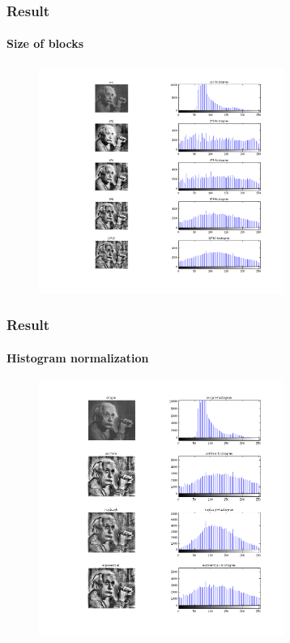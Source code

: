 \documentclass[11 pt,t]{beamer}
\begin{document}
\begin{frame}
\frametitle{Result}
\framesubtitle{Size of blocks}
\begin{minipage}[t]{\linewidth}\centering
\begin{figure}
   \includegraphics[width=8cm]{block.png}
\end{figure}
\end{minipage}
\end{frame}

\begin{frame}
\frametitle{Result}
\framesubtitle{Histogram normalization}
\begin{minipage}[t]{\linewidth}\centering
\begin{figure}
   \includegraphics[width=8cm]{distribution.png}
\end{figure}
\end{minipage}
\end{frame}
\end{document}
